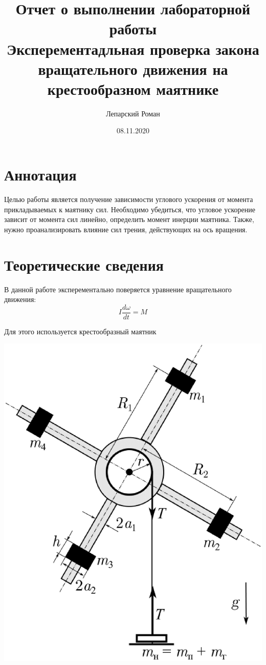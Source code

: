\documentclass[a4paper, 12pt]{article}
\title{Отчет о выполнении лабораторной работы \\ Эксперементадльная проверка закона вращательного движения на крестообразном маятнике}
\author{Лепарский Роман}
\date{08.11.2020}
\begin{document}
\maketitle

\newpage

\section{Аннотация}

Целью работы является получение зависимости углового ускорения от момента прикладываемых к маятнику сил. Необходимо убедиться, что угловое ускорение зависит от момента сил линейно, определить момент инерции маятника. Также, нужно проанализировать влияние сил трения, действующих на ось вращения.

\section{Теоретические сведения}

В данной работе эксперементально поверяется уравнение вращательного движения:
\begin{equation} \label{eq:main}
I\frac{d\omega}{dt} = M
\end{equation}

Для этого используется крестообразный маятник

\begin{center}
\includegraphics[scale = 0.3]{"pendulum.eps"}
\end{center}
\end{document}
